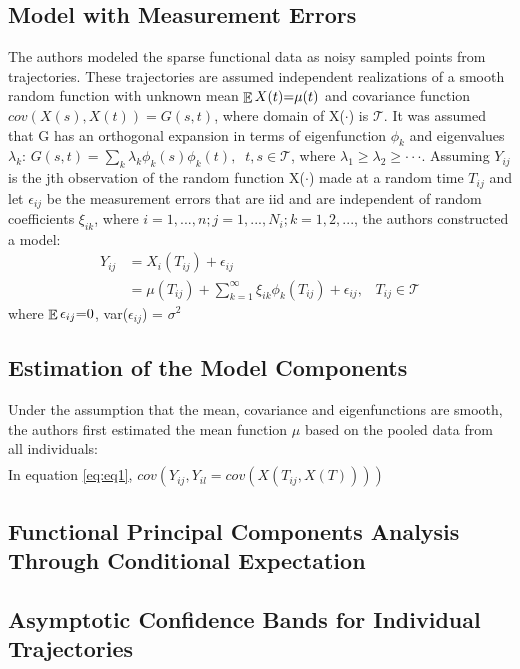 \documentclass[11pt]{report}
\begin{document}
\subsection*{Model with Measurement Errors}
The authors modeled the sparse functional data as noisy sampled points from trajectories. 
These trajectories are assumed independent realizations of a smooth random function with unknown mean $\mathop{\mathbb{E}}{{X(t)}}{=} \mu(t)$ and covariance function $cov(X(s), X(t)) = G(s,t)$, where domain of X($\cdot$) is $\mathcal{T}$.
It was assumed that G has an orthogonal expansion in terms of eigenfunction $\phi_k$ and eigenvalues $\lambda_k$: $G(s,t) = \sum_k{\lambda_k\phi_k(s)\phi_k(t)}, \; \; t, s \in \mathcal{T}$, where $\lambda_1 \geq \lambda_2 \geq \cdot \cdot \cdot$.
Assuming $Y_{ij}$ is the jth observation of the random function X($\cdot$) made at a random time $T_{ij}$ and let $\epsilon_{ij}$ be the measurement errors that are iid and are independent of random coefficients $\xi_{ik}$, where $i = 1, ..., n; j = 1, ..., N_i; k = 1, 2, ...$, the authors constructed a model: 
\begin{align}
	\label{eq:eq1}
	Y_{ij} &= X_i(T_{ij}) + \epsilon_{ij}  \\
	&= \mu(T_{ij}) + \sum_{k=1}^\infty \xi_{ik}\phi_k(T_{ij}) + \epsilon_{ij}, \; \; \;  T_{ij} \in \mathcal{T} 
\end{align}
where $\mathop{\mathbb{E}}{{\epsilon_{ij}}}{=} 0$, var($\epsilon_{ij}$) = $\sigma^2$


\subsection*{Estimation of the Model Components}
Under the assumption that the mean, covariance and eigenfunctions are smooth, the authors first estimated the mean function $\mu$ based on the pooled data from all individuals:
\begin{align}
	\label{eq:}
\end{align}
In equation \eqref{eq:eq1}, $cov(Y_{ij}, Y_{il} = cov(X(T_{ij}, X(T))))$

\subsection*{Functional Principal Components Analysis Through Conditional Expectation}

\subsection*{Asymptotic Confidence Bands for Individual Trajectories}
\end{document}
